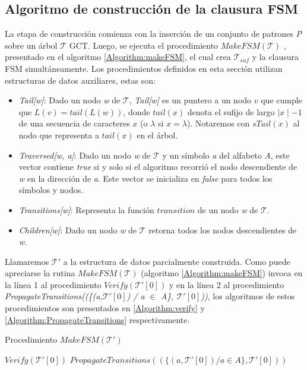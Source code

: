 \subsection{Algoritmo de construcción de la clausura FSM}
\label{subsec:makeFSM}
La etapa de construcción comienza con la inserción de un conjunto de patrones \emph{P} sobre un árbol $\mathcal{T}$ GCT. Luego, se ejecuta el procedimiento $MakeFSM(\mathcal{T})$ \cite{MSW04}, presentado en el algoritmo \ref{Algorithm:makeFSM}, el cual crea $\mathcal{T}_{suf}$ y la clausura FSM simultáneamente. Los procedimientos definidos en esta sección utilizan estructuras de datos auxiliares, estas son:
\begin{itemize}
\item \emph{Tail[w]}: Dado un nodo {\it w} de $\mathcal{T}$, \emph{Tail[w]} es un puntero a un nodo $v$ que cumple que $L(v) = tail(L(w))$, donde $tail(x)$ denota el sufijo de largo $\mid x \mid - 1$ de una secuencia de caracteres $x$ (o $\lambda$ si $x = \lambda$). Notaremos con $sTail(x)$ al nodo que representa a $tail(x)$ en el árbol.
\item \emph{Traversed[w, a]}: Dado un nodo {\it w} de $\mathcal{T}$ y un símbolo {\it a} del alfabeto {\it A}, este vector contiene {\it true} si y solo si el algoritmo recorrió el nodo descendiente de {\it w} en la dirección de {\it a}. Este vector se inicializa en {\it false} para todos los símbolos y nodos.
\item \emph{Transitions[w]}: Representa la función $transition$ de un nodo {\it w} de $\mathcal{T}$.
\item \emph{Children[w]}: Dado un nodo {\it w} de $\mathcal{T}$ retorna todos los nodos descendientes de {\it w}.
\end{itemize}
Llamaremos $\mathcal{T}'$ a la estructura de datos parcialmente construida. Como puede apreciarse la rutina $MakeFSM(\mathcal{T})$ (algoritmo \ref{Algorithm:makeFSM}) invoca en la línea 1 al procedimiento $Verify(\mathcal{T}'[0])$  y en la línea 2 al procedimiento {\it PropagateTransitions((\{(a,$\mathcal{T}'[0]$) / a $\in$ A\}, $\mathcal{T}'[0]$))}, los algoritmos de estos procedimientos son presentados en \ref{Algorithm:verify} y \ref{Algorithm:PropagateTransitions} respectivamente.\\
\begin{algorithm}[h]
\small
\caption{Procedimiento $MakeFSM(\mathcal{T}')$}
\label{Algorithm:makeFSM}
\begin{algorithmic}[1]
\State $Verify(\mathcal{T}'[0])$
\State $PropagateTransitions((\{(a,\mathcal{T}'[0]) / a \in A\}, \mathcal{T}'[0]))$
\Statex
\end{algorithmic}
  \vspace{-0.4cm}%
\end{algorithm}
